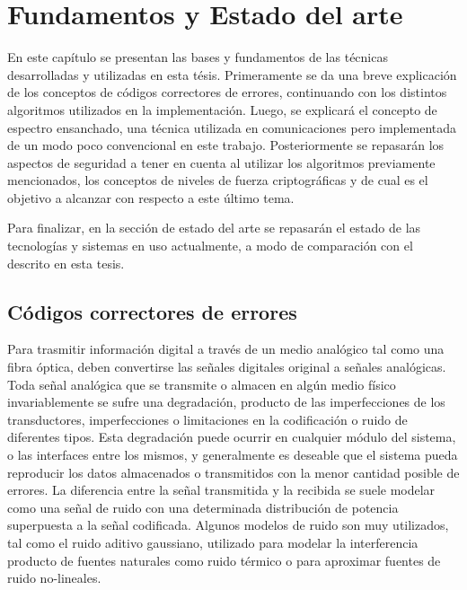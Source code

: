 \chapter{Fundamentos y Estado del arte}

En este capítulo se presentan las bases y fundamentos de las técnicas desarrolladas y utilizadas en esta tésis. 
Primeramente se da una breve explicación de los conceptos de códigos correctores de errores, continuando con los distintos algoritmos utilizados en la implementación. Luego, se explicará el concepto de espectro ensanchado, una técnica utilizada en comunicaciones pero implementada de un modo poco convencional en este trabajo. Posteriormente se repasarán los aspectos de seguridad a tener en cuenta al utilizar los algoritmos previamente mencionados, los conceptos de niveles de fuerza criptográficas y de cual es el objetivo a alcanzar con respecto a este último tema.

Para finalizar, en la sección de estado del arte se repasarán el estado de las tecnologías y sistemas en uso actualmente, a modo de comparación con el descrito en esta tesis.

\section{Códigos correctores de errores}

Para trasmitir información digital a través de un medio analógico tal como una fibra óptica, deben convertirse las señales digitales original a señales analógicas.
Toda señal analógica que se transmite o almacen en algún medio físico invariablemente se sufre una degradación, producto de las imperfecciones de los transductores, imperfecciones o limitaciones en la codificación o ruido de diferentes tipos. Esta degradación puede ocurrir en cualquier módulo del sistema, o las interfaces entre los mismos, y generalmente es deseable que el sistema pueda reproducir los datos almacenados o transmitidos con la menor cantidad posible de errores. La diferencia entre la señal transmitida y la recibida se suele modelar como una señal de ruido con una determinada distribución de potencia superpuesta a la señal codificada. Algunos modelos de ruido son muy utilizados, tal como el ruido aditivo gaussiano, utilizado para modelar la interferencia producto de fuentes naturales como ruido térmico o para aproximar fuentes de ruido no-lineales.

